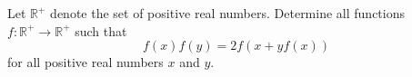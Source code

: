 Let $\mathbb{R}^+$ denote the set of positive real numbers. Determine all functions $f : \mathbb{R}^+ \to \mathbb{R}^+$ such that
\[ f(x)f(y) = 2f(x + yf(x)) \]
for all positive real numbers $x$ and $y$.
